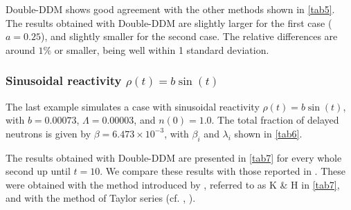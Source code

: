 \documentclass[preprint,12pt,authoryear]{elsarticle}
\begin{document}
Double-DDM shows good agreement with the other methods shown in \cref{tab5}.
The results obtained with Double-DDM are slightly larger for the first case ($a=0.25$), and slightly smaller for the second case.
The relative differences are around $1\%$ or smaller, being well within 1 standard deviation.

\subsubsection{Sinusoidal reactivity $\rho(t)=b\sin(t)$}\label{sec522}

The last example simulates a case with sinusoidal reactivity $\rho(t)=b\sin(t)$, with $b=0.00073$, $\Lambda = 0.00003$, and $n(0)=1.0$. The total fraction of delayed neutrons is given by $\beta=6.473\times 10^{-3}$, with $\beta_i$ and $\lambda_i$ shown in \cref{tab6}.
\begin{table}[H]
\caption{Fraction of delayed neutrons and decay constants for the precursor groups.}\label{tab6}
\end{table}
The results obtained with Double-DDM are presented in \cref{tab7} for every whole second up until $t=10$.
We compare these results with those reported in \citep{wollmann_14}.
These were obtained with the method introduced by \citet{kang_73}, referred to as K \& H in \cref{tab7}, and with the method of Taylor series (cf. \citeauthor{nahla_11}, \citeyear{nahla_11}).
\end{document}
